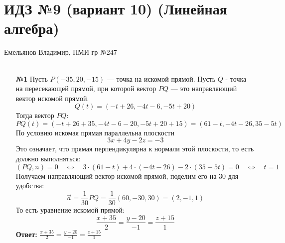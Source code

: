 \documentclass[a4paper]{article}
\renewcommand{\f}[2]{\frac{#1}{#2}}
\newcommand{\lr}{\Leftrightarrow}
\begin{document}
\section*{ИДЗ №9 (вариант 10) (Линейная алгебра)}
 {\large Емельянов Владимир, ПМИ гр №247}\\\\
\begin{enumerate}
    \item[\textbf{№1}]Пусть $P(-35,20,-15)$ --- точка на искомой прямой. Пусть $Q$ - точка на пересекающей прямой, при которой вектор $PQ$ --- это направляющий вектор искомой прямой.
    $$Q(t) = (-t+26, -4t-6, -5t+20)$$
    Тогда вектор $PQ$:
    $$PQ(t) = (-t+26+35, -4t-6-20, -5t+20+15) = (61-t, -4t-26, 35-5t)$$
    По условию искомая прямая параллельна плоскости 
    $$3x+4y-2z=-3$$ 
    Это означает, что прямая перпендикулярна к нормали этой плоскости, то есть должно выполняться:
    $$(PQ, n) = 0 \quad \lr \quad  3\cdot(61-t) + 4\cdot(-4t-26) -2\cdot(35-5t) = 0 \quad \lr \quad t = 1$$
    Получаем направляющий вектор искомой прямой, поделим его на $30$ для удобства:
    $$\vec{a} = \f{1}{30}PQ= \f{1}{30}(60, -30, 30) = (2, -1, 1)$$
    То есть уравнение искомой прямой:
    $$\f{x+35}{2} = \f{y-20}{-1} = \f{z+15}{1}$$
    \textbf{Ответ: }$\f{x+35}{2} = \f{y-20}{-1} = \f{z+15}{1}$\\



\end{enumerate}
\end{document}
